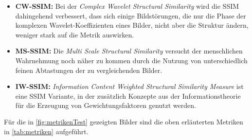 \begin{itemize}
	\item \textbf{CW-SSIM\cite{Gao2011}:} Bei der \textit{Complex Wavelet Structural Similarity} wird die SSIM dahingehend verbessert, dass sich einige Bildstörungen, die nur die Phase der komplexen Wavelet-Koeffizienten eines Bilder, nicht aber die Struktur ändern, weniger stark auf die Metrik auswirken.
	\item \textbf{MS-SSIM\cite{Wang2003}:} Die \textit{Multi Scale Structural Similarity} versucht der menschlichen Wahrnehmung noch näher zu kommen durch die Nutzung von unterschiedlich feinen Abtastungen der zu vergleichenden Bilder.
	\item \textbf{IW-SSIM\cite{Wang2011}:} \textit{Information Content Weighted Structural Similarity Measure} ist eine SSIM Variante, in der zusätzlich Konzepte aus der Informationstheorie für die Erzeugung von Gewichtungsfaktoren genutzt werden.
\end{itemize}

Für die in \autoref{fig:metrikenTest} gezeigten Bilder sind die oben erläuterten Metriken in \autoref{tab:metriken} aufgeführt.

